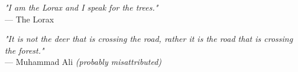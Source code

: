 \begin{flushright}
\emph{"I am the Lorax and I speak for the trees."}\\
 — The Lorax
\end{flushright}
\vspace{2em}
\begin{flushright}
\emph{"It is not the deer that is crossing the road, rather it is the road that is crossing the forest."}\\
    — Muhammad Ali \textit{(probably misattributed)}
\end{flushright}
